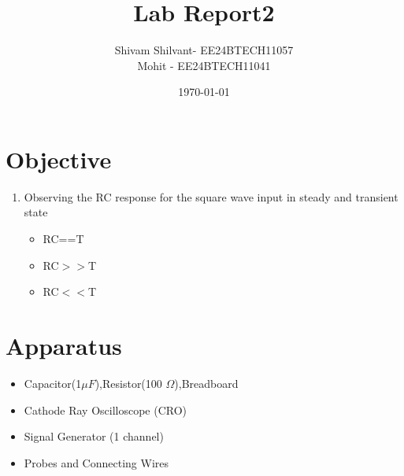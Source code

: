 \documentclass[a4paper,12pt]{article}
\title{Lab Report2}
\author{Shivam Shilvant- EE24BTECH11057\\Mohit - EE24BTECH11041}
\date{\today}
\begin{document}
\maketitle
\section*{Objective}
\begin{enumerate}
    \item Observing the RC response for the square wave input in steady and transient state
    \begin{itemize}
        \item RC==T
        \item RC$>>$T
        \item RC$<<$T
    \end{itemize}
\end{enumerate}
\section*{Apparatus}
\begin{itemize}
    \item Capacitor(1$\mu F$),Resistor(100 $\Omega$),Breadboard
    \item Cathode Ray Oscilloscope (CRO)
    \item Signal Generator (1 channel)
    \item Probes and Connecting Wires
\newpage
\end{itemize}
\end{document}
